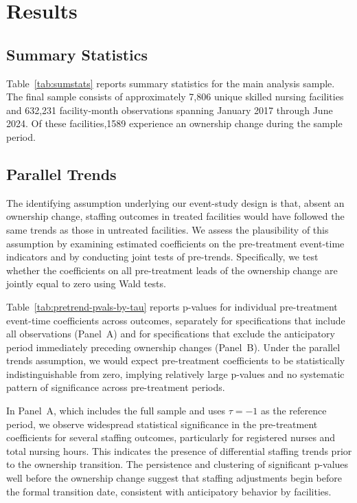\documentclass[preprint,authoryear]{elsarticle}
\begin{document}
\section{Results}

\subsection{Summary Statistics}

Table~\ref{tab:sumstats} reports summary statistics for the main analysis sample. The final sample consists of approximately 7,806 unique skilled nursing facilities and 632,231 facility-month observations spanning January 2017 through June 2024. Of these facilities,1589 experience an ownership change during the sample period.


\FloatBarrier

\subsection{Parallel Trends}

The identifying assumption underlying our event-study design is that, absent an ownership change, staffing outcomes in treated facilities would have followed the same trends as those in untreated facilities. We assess the plausibility of this assumption by examining estimated coefficients on the pre-treatment event-time indicators and by conducting joint tests of pre-trends. Specifically, we test whether the coefficients on all pre-treatment leads of the ownership change are jointly equal to zero using Wald tests. 

Table~\ref{tab:pretrend-pvals-by-tau} reports p-values for individual pre-treatment event-time coefficients across outcomes, separately for specifications that include all observations (Panel~A) and for specifications that exclude the anticipatory period immediately preceding ownership changes (Panel~B). Under the parallel trends assumption, we would expect pre-treatment coefficients to be statistically indistinguishable from zero, implying relatively large p-values and no systematic pattern of significance across pre-treatment periods.


\FloatBarrier

In Panel~A, which includes the full sample and uses $\tau=-1$ as the reference period, we observe widespread statistical significance in the pre-treatment coefficients for several staffing outcomes, particularly for registered nurses and total nursing hours. This indicates the presence of differential staffing trends prior to the ownership transition. The persistence and clustering of significant p-values well before the ownership change suggest that staffing adjustments begin before the formal transition date, consistent with anticipatory behavior by facilities.
\end{document}
